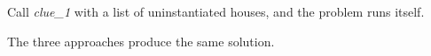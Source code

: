 \begin{enumerate}



Call \textit{clue\_1} with a list of uninstantiated houses, and the problem runs itself.
\end{enumerate}
\smallv 

The three approaches produce the same solution.

